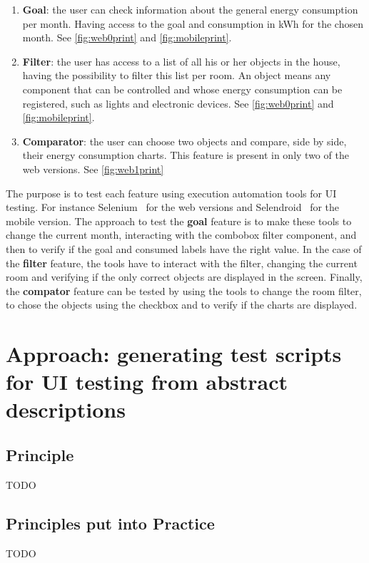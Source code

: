 \documentclass{chi-ext}
\begin{document}
\begin{enumerate}
\item \textbf{Goal}: the user can check information about the general energy consumption per month. Having access to the goal and consumption in kWh for the chosen month. See \autoref{fig:web0print} and \autoref{fig:mobileprint}.

\item \textbf{Filter}: the user has access to a list of all his or her objects in the house, having the possibility to filter this list per room. An object means any component that can be controlled and whose energy consumption can be registered, such as lights and electronic devices. See \autoref{fig:web0print} and \autoref{fig:mobileprint}.

\item \textbf{Comparator}: the user can choose two objects and compare, side by side, their energy consumption charts. This feature is present in only two of the web versions. See \autoref{fig:web1print}
\end{enumerate} 

The purpose is to test each feature using execution automation tools for UI testing. For instance Selenium~\cite{selenium} for the web versions and Selendroid~\cite{selendroid} for the mobile version. The approach to test the \textbf{goal} feature is to make these tools to change the current month, interacting with the combobox filter component, and then to verify if the goal and consumed labels have the right value. In the case of the \textbf{filter} feature, the tools have to interact with the filter, changing the current room and verifying if the only correct objects are displayed in the screen. Finally, the \textbf{compator} feature can be tested by using the tools to change the room filter, to chose the objects using the checkbox and to verify if the charts are displayed.


\section{Approach: generating test scripts for UI testing from abstract descriptions}
\subsection{Principle}
TODO

\subsection{Principles put into Practice}
TODO
\end{document}

